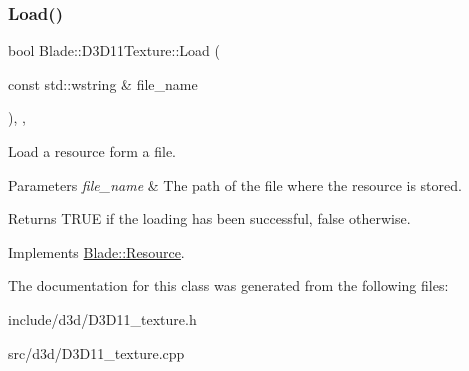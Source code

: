 \subsubsection{\texorpdfstring{Load()}{Load()}}
{\footnotesize\ttfamily bool Blade\+::\+D3\+D11\+Texture\+::\+Load (\begin{DoxyParamCaption}\item[{const std\+::wstring \&}]{file\+\_\+name }\end{DoxyParamCaption})\hspace{0.3cm}{\ttfamily [override]}, {\ttfamily [virtual]}, {\ttfamily [noexcept]}}



Load a resource form a file. 


\begin{DoxyParams}{Parameters}
{\em file\+\_\+name} & The path of the file where the resource is stored. \\
\hline
\end{DoxyParams}
\begin{DoxyReturn}{Returns}
T\+R\+UE if the loading has been successful, false otherwise. 
\end{DoxyReturn}


Implements \hyperlink{class_blade_1_1_resource_ad89ab00a3b81df1338a8310ec92c5cff}{Blade\+::\+Resource}.



The documentation for this class was generated from the following files\+:\begin{DoxyCompactItemize}
\item 
include/d3d/D3\+D11\+\_\+texture.\+h\item 
src/d3d/D3\+D11\+\_\+texture.\+cpp\end{DoxyCompactItemize}
